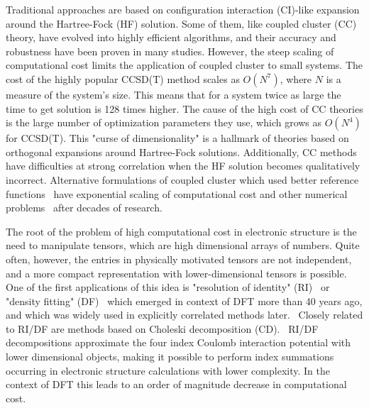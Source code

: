 Traditional approaches are based on configuration interaction (CI)-like 
expansion around the Hartree-Fock (HF) solution. Some of them, like coupled 
cluster (CC) theory, have evolved into highly efficient 
algorithms,\cite{crawford2000introduction,tew2007electron} and their accuracy 
and robustness have been proven in many 
studies.\cite{bartlett2007coupled, larsen2000full, 
feller2001extended, tajti2004heat, heckert2006basis, rauhut2009accurate} 
However, the steep scaling of computational cost limits the application of 
coupled cluster to small systems. 
The cost of the highly popular CCSD(T) method scales as $O(N^7)$, where $N$ is a 
measure of the system's size. This means that for a system twice as large 
the time to get solution is 128 times higher. The cause of the high cost of CC 
theories is the large number of optimization parameters they use, which grows 
as $O(N^4)$ for CCSD(T). This "curse of dimensionality" is a hallmark of 
theories based on orthogonal expansions around Hartree-Fock solutions.
Additionally, CC methods have difficulties at strong correlation when the HF 
solution becomes qualitatively incorrect. Alternative formulations of coupled 
cluster which used better reference 
functions~\cite{jeziorski1981coupled,mukherjee1989use} have exponential 
scaling of computational cost and other numerical 
problems~\cite{lyakh2011multireference} after decades 
of research.

The root of the problem of high computational cost in electronic structure is 
the need to manipulate tensors, which are high dimensional arrays of numbers. 
Quite often, however, the entries in physically motivated tensors are not 
independent, and a more compact representation with lower-dimensional tensors is 
possible. One of the first applications of this idea is "resolution of 
identity" (RI)~\cite{vahtras1993integral,weigend1998ri,hattig2000cc2, 
ahlrichs2004efficient} or "density fitting" 
(DF)~\cite{werner2003fast,schutz2003linear,manby2003density} which emerged in 
context of DFT more than 40 years ago, and which was widely used in explicitly 
correlated methods 
later.~\cite{kutzelnigg1985r,rychlewski2013explicitly,valeev2000evaluation} 
Closely related to RI/DF are methods based on 
Choleski decomposition (CD).~\cite{weigend2009approximated} RI/DF decompositions 
approximate the 
four index Coulomb interaction potential with lower dimensional objects, making 
it possible to perform index summations occurring in electronic structure 
calculations with lower complexity. In the context of DFT this leads to an 
order of magnitude decrease in computational cost. 

